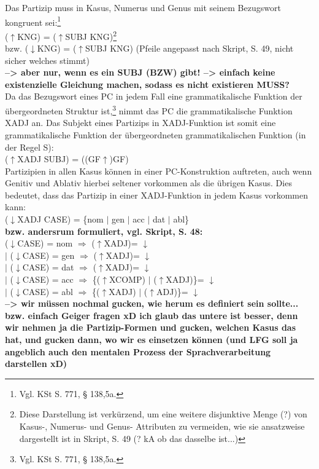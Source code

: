 \documentclass[12pt,a4paper]{article}
\begin{document}
Das Partizip muss in Kasus, Numerus und Genus mit seinem Bezugswort kongruent sei:\footnote{Vgl. KSt S. 771, § 138,5a.}\\
($\uparrow$KNG) = ($\uparrow$SUBJ KNG)\footnote{Diese Darstellung ist verkürzend, um eine weitere disjunktive Menge (?) von Kasus-, Numerus- und Genus- Attributen zu vermeiden, wie sie ansatzweise dargestellt ist in Skript, S. 49 (? kA ob das dasselbe ist...)} \\
bzw. ($\downarrow$KNG) = ($\uparrow$SUBJ KNG) (Pfeile angepasst nach Skript, S. 49, nicht sicher welches stimmt)\\
\textbf{--> aber nur, wenn es ein SUBJ (BZW) gibt! --> einfach keine existenzielle Gleichung machen, sodass es nicht existieren MUSS?} \\

Da das Bezugswort eines PC in jedem Fall eine grammatikalische Funktion der übergeordneten Struktur ist,\footnote{Vgl. KSt S. 771, § 138,5a.} nimmt das PC die grammatikalische Funktion XADJ an. Das Subjekt eines Partizips in XADJ-Funktion ist somit eine grammatikalische Funktion der übergeordneten grammatikalischen Funktion (in der Regel S): \\
($\uparrow$XADJ SUBJ) = ((GF$\uparrow$)GF) \\
Partizipien in allen Kasus können in einer PC-Konstruktion auftreten, auch wenn Genitiv und Ablativ hierbei seltener vorkommen als die übrigen Kasus. Dies bedeutet, dass das Partizip in einer XADJ-Funktion in jedem Kasus vorkommen kann: \\
($\downarrow$XADJ CASE) = \{nom $\mid$ gen $\mid$ acc $\mid$ dat $\mid$ abl\} \\
\textbf{bzw. andersrum formuliert, vgl. Skript, S. 48:} \\
($\downarrow$CASE) = nom $\Rightarrow$ ($\uparrow$XADJ)= $\downarrow$ \\
$\mid$ ($\downarrow$CASE) = gen $\Rightarrow$ ($\uparrow$XADJ)= $\downarrow$ \\
$\mid$ ($\downarrow$CASE) = dat $\Rightarrow$ ($\uparrow$XADJ)= $\downarrow$ \\
$\mid$ ($\downarrow$CASE) = acc $\Rightarrow$ \{($\uparrow$XCOMP) $\mid$ ($\uparrow$XADJ)\}= $\downarrow$ \\
$\mid$ ($\downarrow$CASE) = abl $\Rightarrow$ \{($\uparrow$XADJ) $\mid$ ($\uparrow$ADJ)\}= $\downarrow$ \\

\textbf{--> wir müssen nochmal gucken, wie herum es definiert sein sollte... bzw. einfach Geiger fragen xD ich glaub das untere ist besser, denn wir nehmen ja die Partizip-Formen und gucken, welchen Kasus das hat, und gucken dann, wo wir es einsetzen können (und LFG soll ja angeblich auch den mentalen Prozess der Sprachverarbeitung darstellen xD)}
\end{document}
